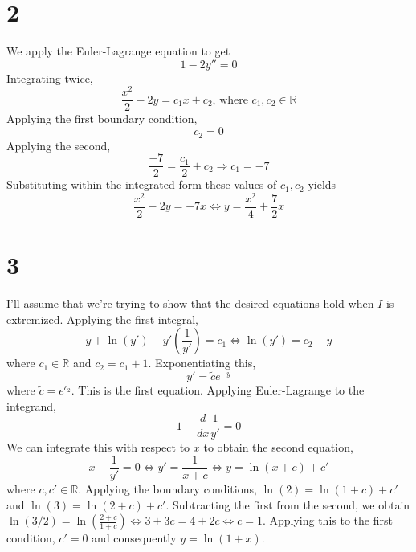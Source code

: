 \documentclass{article}
\begin{document}
\section*{2}
We apply the Euler-Lagrange equation to get
\[1-2y''=0\]
Integrating twice,
\[\frac{x^2}{2}-2y=c_1x+c_2\textrm{, where }c_1,c_2\in\mathbb{R}\]
Applying the first boundary condition,
\[c_2 = 0\]
Applying the second,
\[\frac{-7}{2}=\frac{c_1}{2}+c_2\Rightarrow c_1 = -7\]
Substituting within the integrated form these values of $c_1,c_2$ yields
\[\frac{x^2}{2}-2y=-7x\Leftrightarrow y =\frac{x^2}{4}+\frac{7}{2}x\]
\section*{3}
I'll assume that we're trying to show that the desired equations hold when $I$ is extremized.
Applying the first integral,
\[y+\ln(y')-y'\left( \frac{1}{y'} \right)=c_1\Leftrightarrow  \ln(y')=c_2-y\]
where $c_1\in\mathbb{R}$ and $c_2=c_1+1$.
Exponentiating this,
\[y'=\tilde{c}e^{-y}\]
where $\tilde{c}=e^{c_2}$. This is the first equation.
Applying Euler-Lagrange to the integrand,
\[1-\frac{d}{dx}\frac{1}{y'}= 0\]
We can integrate this with respect to $x$ to obtain the second equation,
\[x-\frac{1}{y'}=0\Leftrightarrow y' = \frac{1}{x+c}\Leftrightarrow y = \ln(x+c)+c'\]
where $c,c'\in\mathbb{R}$. Applying the boundary conditions, $\ln(2) = \ln(1+c)+c'$ and $\ln(3)=\ln(2+c)+c'$.
Subtracting the first from the second, we obtain $\ln(3/2) = \ln(\frac{2+c}{1+c}) \Leftrightarrow 3+3c=4+2c\Leftrightarrow c=1$.
Applying this to the first condition, $c'=0$ and consequently $y=\ln(1+x)$.
\end{document}
